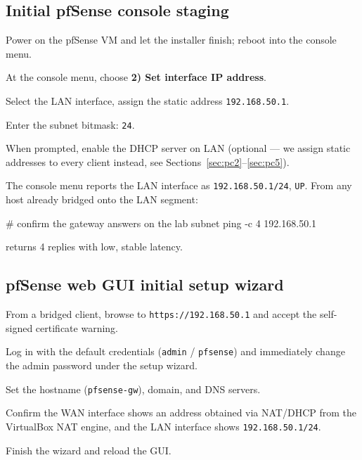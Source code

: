 \documentclass[11pt,a4paper]{article}
\begin{document}
\subsection{Initial pfSense console staging}
\begin{steps}
\item Power on the pfSense VM and let the installer finish; reboot into the console menu.
\item At the console menu, choose \textbf{2) Set interface IP address}.
\item Select the LAN interface, assign the static address \texttt{192.168.50.1}.
\item Enter the subnet bitmask: \texttt{24}.
\item When prompted, enable the DHCP server on LAN (optional --- we assign static
  addresses to every client instead, see Sections~\ref{sec:pc2}--\ref{sec:pc5}).
\end{steps}

\begin{expectbox}
The console menu reports the LAN interface as \texttt{192.168.50.1/24}, \texttt{UP}.
From any host already bridged onto the LAN segment:
\begin{cmdverb}
# confirm the gateway answers on the lab subnet
ping -c 4 192.168.50.1
\end{cmdverb}
returns 4 replies with low, stable latency.
\end{expectbox}

\subsection{pfSense web GUI initial setup wizard}
\begin{steps}
\item From a bridged client, browse to \texttt{https://192.168.50.1} and accept the
  self-signed certificate warning.
\item Log in with the default credentials (\texttt{admin} / \texttt{pfsense}) and
  immediately change the admin password under the setup wizard.
\item Set the hostname (\texttt{pfsense-gw}), domain, and DNS servers.
\item Confirm the WAN interface shows an address obtained via NAT/DHCP from the
  VirtualBox NAT engine, and the LAN interface shows \texttt{192.168.50.1/24}.
\item Finish the wizard and reload the GUI.
\end{steps}
\end{document}
